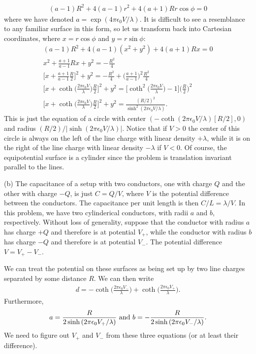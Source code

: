 {\begin{gather}
        (a - 1) R^2 + 4(a - 1) r^2 + 4(a + 1) R r \cos{\phi} = 0
\end{gather}
where we have denoted $a = \exp(4 \pi \epsilon_0 V / \lambda)$.
It is difficult to see a resemblance to any familiar surface in this form, so let us transform back into Cartesian coordinates, where $x = r \cos{\phi}$ and $y = r \sin{\phi}$:
\begin{gather}
    (a - 1) R^2 + 4(a - 1) (x^2 + y^2) + 4(a + 1) R x = 0 \\
    x^2 + \frac{a + 1}{a-1}Rx + y^2 = - \frac{R^2}{4} \\
    \Big[ x + \frac{a+1}{a-1} \frac{R}{2} \Big]^2 + y^2 = - \frac{R^2}{4} + \Big(\frac{a+1}{a - 1} \Big)^2  \frac{R^2}{4} \\
    \Big[ x + \coth{\Big( \frac{2 \pi \epsilon_0 V}{\lambda} \Big)} \frac{R}{2} \Big]^2 + y^2 = \Big[ \coth^2{\Big( \frac{2 \pi \epsilon_0 V}{\lambda} \Big)} - 1 \Big] \Big( \frac{R}{2} \Big)^2 \\
    \Big[ x + \coth{\Big( \frac{2 \pi \epsilon_0 V}{\lambda} \Big)} \frac{R}{2} \Big]^2 + y^2 = \frac{(R/2)^2}{\sinh^2{( 2 \pi \epsilon_0 V / \lambda ) }}
.\end{gather}
This is just the equation of a circle with center $(-\coth{(2 \pi \epsilon_0 V / \lambda)} [R / 2], 0)$ and radius $(R/2)/|\sinh{(2 \pi \epsilon_0 V / \lambda)}|$.
Notice that if $V > 0$ the center of this circle is always on the left of the line charge with linear density $+ \lambda$, while it is on the right of the line charge with linear density $-\lambda$ if $V < 0$.
Of course, the equipotential surface is a cylinder since the problem is translation invariant parallel to the lines.

(b) The capacitance of a setup with two conductors, one with charge $Q$ and the other with charge $-Q$, is just $C = Q/V$, where $V$ is the potential difference between the conductors.
The capacitance per unit length is then $C/L = \lambda/V$.
In this problem, we have two cylinderical conductors, with radii $a$ and $b$, respectively.
Without loss of generality, suppose that the conductor with radius $a$ has charge $+Q$ and therefore is at potential $V_{+}$, while the conductor with radius $b$ has charge $-Q$ and therefore is at potential $V_{-}$.
The potential difference $V = V_{+} - V_{-}$.

We can treat the potential on these surfaces as being set up by two line charges separated by some distance $R$.
We can then write
\begin{eqnarray}
    \label{eq:d}
    d = -\coth{\Big( \frac{2 \pi \epsilon_0 V_{-}}{\lambda} \Big)} + \coth{ \Big( \frac{2 \pi \epsilon_0 V_{+}}{\lambda} \Big) }
.\end{eqnarray}
Furthermore,
\begin{eqnarray}
    a = \frac{R}{2 \sinh{(2 \pi \epsilon_0 V_{+}} / \lambda)} ~{\rm and}~ b = -\frac{R}{2 \sinh{(2 \pi \epsilon_0 V_{-} / \lambda)}}
.\end{eqnarray}
We need to figure out $V_{+}$ and $V_{-}$ from these three equations (or at least their difference).

}

